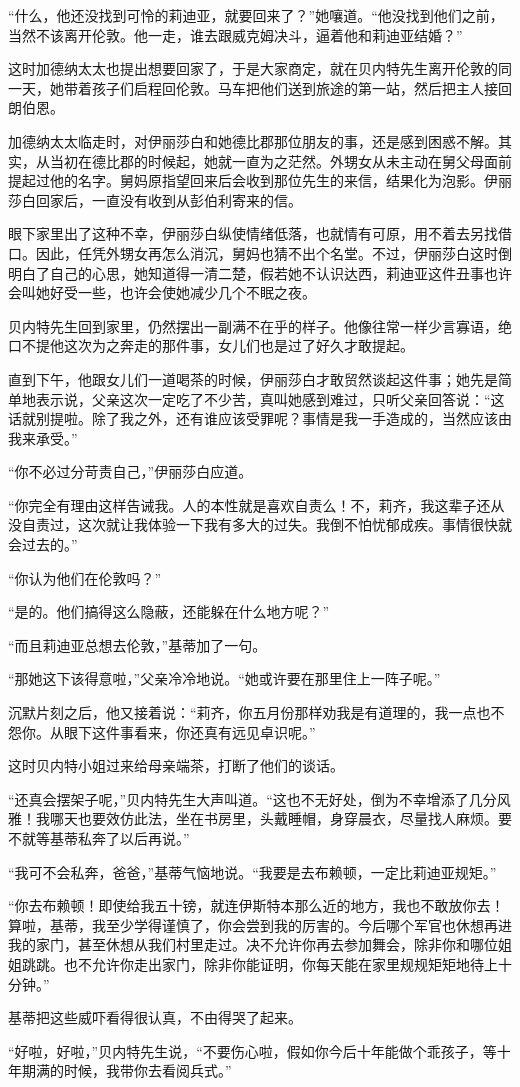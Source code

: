 \par “什么，他还没找到可怜的莉迪亚，就要回来了？”她嚷道。“他没找到他们之前，当然不该离开伦敦。他一走，谁去跟威克姆决斗，逼着他和莉迪亚结婚？”
\par 这时加德纳太太也提出想要回家了，于是大家商定，就在贝内特先生离开伦敦的同一天，她带着孩子们启程回伦敦。马车把他们送到旅途的第一站，然后把主人接回朗伯恩。
\par 加德纳太太临走时，对伊丽莎白和她德比郡那位朋友的事，还是感到困惑不解。其实，从当初在德比郡的时候起，她就一直为之茫然。外甥女从未主动在舅父母面前提起过他的名字。舅妈原指望回来后会收到那位先生的来信，结果化为泡影。伊丽莎白回家后，一直没有收到从彭伯利寄来的信。
\par 眼下家里出了这种不幸，伊丽莎白纵使情绪低落，也就情有可原，用不着去另找借口。因此，任凭外甥女再怎么消沉，舅妈也猜不出个名堂。不过，伊丽莎白这时倒明白了自己的心思，她知道得一清二楚，假若她不认识达西，莉迪亚这件丑事也许会叫她好受一些，也许会使她减少几个不眠之夜。
\par 贝内特先生回到家里，仍然摆出一副满不在乎的样子。他像往常一样少言寡语，绝口不提他这次为之奔走的那件事，女儿们也是过了好久才敢提起。
\par 直到下午，他跟女儿们一道喝茶的时候，伊丽莎白才敢贸然谈起这件事；她先是简单地表示说，父亲这次一定吃了不少苦，真叫她感到难过，只听父亲回答说：“这话就别提啦。除了我之外，还有谁应该受罪呢？事情是我一手造成的，当然应该由我来承受。”
\par “你不必过分苛责自己，”伊丽莎白应道。
\par “你完全有理由这样告诫我。人的本性就是喜欢自责么！不，莉齐，我这辈子还从没自责过，这次就让我体验一下我有多大的过失。我倒不怕忧郁成疾。事情很快就会过去的。”
\par “你认为他们在伦敦吗？”
\par “是的。他们搞得这么隐蔽，还能躲在什么地方呢？”
\par “而且莉迪亚总想去伦敦，”基蒂加了一句。
\par “那她这下该得意啦，”父亲冷冷地说。“她或许要在那里住上一阵子呢。”
\par 沉默片刻之后，他又接着说：“莉齐，你五月份那样劝我是有道理的，我一点也不怨你。从眼下这件事看来，你还真有远见卓识呢。”
\par 这时贝内特小姐过来给母亲端茶，打断了他们的谈话。
\par “还真会摆架子呢，”贝内特先生大声叫道。“这也不无好处，倒为不幸增添了几分风雅！我哪天也要效仿此法，坐在书房里，头戴睡帽，身穿晨衣，尽量找人麻烦。要不就等基蒂私奔了以后再说。”
\par “我可不会私奔，爸爸，”基蒂气恼地说。“我要是去布赖顿，一定比莉迪亚规矩。”
\par “你去布赖顿！即使给我五十镑，就连伊斯特本那么近的地方，我也不敢放你去！算啦，基蒂，我至少学得谨慎了，你会尝到我的厉害的。今后哪个军官也休想再进我的家门，甚至休想从我们村里走过。决不允许你再去参加舞会，除非你和哪位姐姐跳跳。也不允许你走出家门，除非你能证明，你每天能在家里规规矩矩地待上十分钟。”
\par 基蒂把这些威吓看得很认真，不由得哭了起来。
\par “好啦，好啦，”贝内特先生说，“不要伤心啦，假如你今后十年能做个乖孩子，等十年期满的时候，我带你去看阅兵式。”





